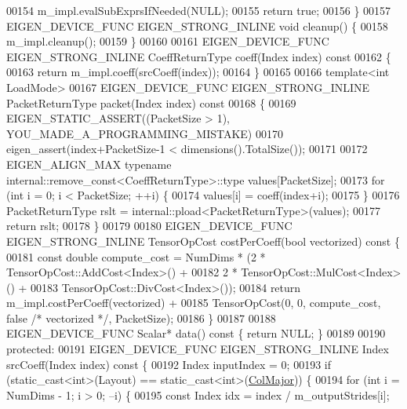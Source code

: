 \begin{DoxyCode}
00154     m\_impl.evalSubExprsIfNeeded(NULL);
00155     \textcolor{keywordflow}{return} \textcolor{keyword}{true};
00156   \}
00157   EIGEN\_DEVICE\_FUNC EIGEN\_STRONG\_INLINE \textcolor{keywordtype}{void} cleanup() \{
00158     m\_impl.cleanup();
00159   \}
00160 
00161   EIGEN\_DEVICE\_FUNC EIGEN\_STRONG\_INLINE CoeffReturnType coeff(Index index)\textcolor{keyword}{ const}
00162 \textcolor{keyword}{  }\{
00163     \textcolor{keywordflow}{return} m\_impl.coeff(srcCoeff(index));
00164   \}
00165 
00166   \textcolor{keyword}{template}<\textcolor{keywordtype}{int} LoadMode>
00167   EIGEN\_DEVICE\_FUNC EIGEN\_STRONG\_INLINE PacketReturnType packet(Index index)\textcolor{keyword}{ const}
00168 \textcolor{keyword}{  }\{
00169     EIGEN\_STATIC\_ASSERT((PacketSize > 1), YOU\_MADE\_A\_PROGRAMMING\_MISTAKE)
00170     eigen\_assert(index+PacketSize-1 < dimensions().TotalSize());
00171 
00172     EIGEN\_ALIGN\_MAX \textcolor{keyword}{typename} internal::remove\_const<CoeffReturnType>::type values[PacketSize];
00173     \textcolor{keywordflow}{for} (\textcolor{keywordtype}{int} i = 0; i < PacketSize; ++i) \{
00174       values[i] = coeff(index+i);
00175     \}
00176     PacketReturnType rslt = internal::pload<PacketReturnType>(values);
00177     \textcolor{keywordflow}{return} rslt;
00178   \}
00179 
00180   EIGEN\_DEVICE\_FUNC EIGEN\_STRONG\_INLINE TensorOpCost costPerCoeff(\textcolor{keywordtype}{bool} vectorized)\textcolor{keyword}{ const }\{
00181     \textcolor{keyword}{const} \textcolor{keywordtype}{double} compute\_cost = NumDims * (2 * TensorOpCost::AddCost<Index>() +
00182                                            2 * TensorOpCost::MulCost<Index>() +
00183                                            TensorOpCost::DivCost<Index>());
00184     \textcolor{keywordflow}{return} m\_impl.costPerCoeff(vectorized) +
00185            TensorOpCost(0, 0, compute\_cost, \textcolor{keyword}{false} \textcolor{comment}{/* vectorized */}, PacketSize);
00186   \}
00187 
00188   EIGEN\_DEVICE\_FUNC Scalar* data()\textcolor{keyword}{ const }\{ \textcolor{keywordflow}{return} NULL; \}
00189 
00190  \textcolor{keyword}{protected}:
00191   EIGEN\_DEVICE\_FUNC EIGEN\_STRONG\_INLINE Index srcCoeff(Index index)\textcolor{keyword}{ const }\{
00192     Index inputIndex = 0;
00193     \textcolor{keywordflow}{if} (static\_cast<int>(Layout) == static\_cast<int>(\hyperlink{group__enums_ggaacded1a18ae58b0f554751f6cdf9eb13a0cbd4bdd0abcfc0224c5fcb5e4f6669a}{ColMajor})) \{
00194       \textcolor{keywordflow}{for} (\textcolor{keywordtype}{int} i = NumDims - 1; i > 0; --i) \{
00195         \textcolor{keyword}{const} Index idx = index / m\_outputStrides[i];

\end{DoxyCode}
